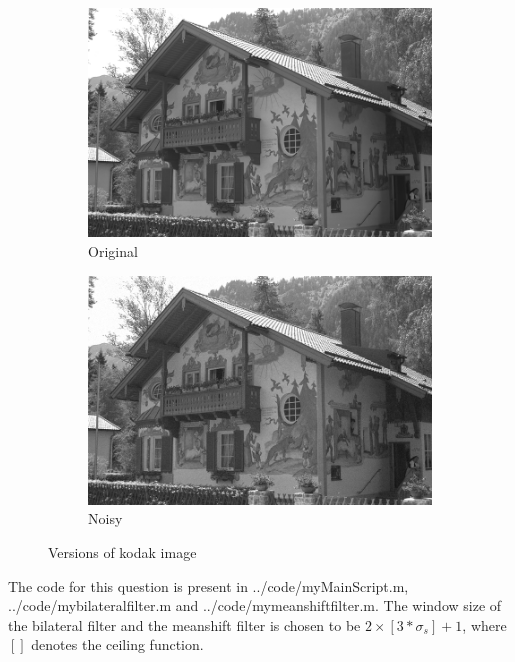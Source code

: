 \documentclass[12pt]{article}
\begin{document}
\begin{figure}[h]
    \centering
    \begin{subfigure}[b]{0.3\textwidth}
        \centering
        \includegraphics[width=\textwidth]{../images/kodak24.png}
        \caption{Original}
        \label{fig:subfig1}
    \end{subfigure}
    \begin{subfigure}[b]{0.3\textwidth}
        \centering
        \includegraphics[width=\textwidth]{../images/noisy_kodak24.png}
        \caption{Noisy }
        \label{fig:subfig2}
    \end{subfigure}
    \caption{Versions of kodak image}
    \label{fig:kodak}
\end{figure}

The code for this question is present in {../code/myMainScript.m}, \\ {../code/mybilateralfilter.m} and {../code/mymeanshiftfilter.m}. The window size of the bilateral filter and the meanshift filter is chosen to be $2\times [3*\sigma_s] + 1$, where $[]$ denotes the ceiling function.
\end{document}
